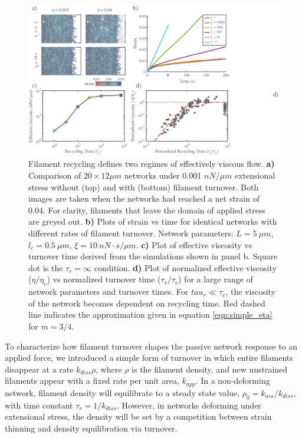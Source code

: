 \documentclass[10pt,letterpaper]{article}
\begin{document}
\begin{figure}[h!]
	\centering
	\includegraphics[width=\hsize]{figures/figure4}
	\caption{\label{fig:passive_rec}  Filament recycling defines two regimes of effectively viscous flow. \textbf{a)} Comparison of $20 \times 12 \mu m$ networks under 0.001 $nN/\mu m$ extensional stress without (top) and with (bottom) filament turnover.  Both images are taken when the networks had reached a net strain of 0.04.  For clarity, filaments that leave the domain of applied stress are greyed out. \textbf{b)} Plots of strain vs time for identical networks with different rates of filament turnover.  Network parameters: $L=5\: \mu m$, $l_c=0.5\: \mu m$, $\xi=10\: nN\cdot s/\mu m$. \textbf{c)}  Plot of effective viscosity vs turnover time derived from the simulations shown in panel b.  Square dot is the $\tau_r=\infty$ condition.  \textbf{d)} Plot of normalized effective viscosity ($\eta/\eta_c$) vs normalized turnover time ($\tau_r/\tau_c$) for a large range of network parameters and turnover times. For $tau_r \ll \tau_c$, the viscosity of the network becomes dependent on recycling time. Red dashed line indicates the approximation given in equation \ref{eqn:simple_eta} for $m=3/4$.}
\end{figure}

To characterize how filament turnover shapes the passive network response to an applied force, we introduced a simple form of turnover in which entire filaments disappear at a rate $k_{diss}\rho$, where $\rho$ is the filament density, and new unstrained filaments appear with a fixed rate per unit area, $k_{app}$. In a non-deforming network,  filament density will equilibrate to a steady state value, $\rho_0 = k_{ass}/k_{diss}$, with time constant $\tau_r = 1/k_{diss}$.  However, in networks deforming under extensional stress, the density will be set by a competition between strain thinning and density equilibration via turnover. 
\end{document}
